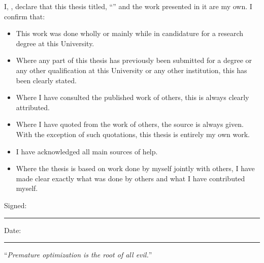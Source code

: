 \documentclass[
11pt, %
english, %
singlespacing, %
headsepline, %
]{MastersDoctoralThesis} %
\begin{document}

\begin{declaration}
	\addchaptertocentry{\authorshipname} %
	\noindent I, \authorname, declare that this thesis titled, \enquote{\ttitle} and the work presented in it are my own. I confirm that:

	\begin{itemize}
		\item This work was done wholly or mainly while in candidature for a research degree at this University.
		\item Where any part of this thesis has previously been submitted for a degree or any other qualification at this University or any other institution, this has been clearly stated.
		\item Where I have consulted the published work of others, this is always clearly attributed.
		\item Where I have quoted from the work of others, the source is always given. With the exception of such quotations, this thesis is entirely my own work.
		\item I have acknowledged all main sources of help.
		\item Where the thesis is based on work done by myself jointly with others, I have made clear exactly what was done by others and what I have contributed myself.\\
	\end{itemize}

	\noindent Signed:\\
	\rule[0.5em]{25em}{0.5pt} %

	\noindent Date:\\
	\rule[0.5em]{25em}{0.5pt} %
\end{declaration}

\cleardoublepage


\vspace*{0.2\textheight}

\noindent\enquote{\itshape Premature optimization is the root of all evil.}\bigbreak
\end{document}
